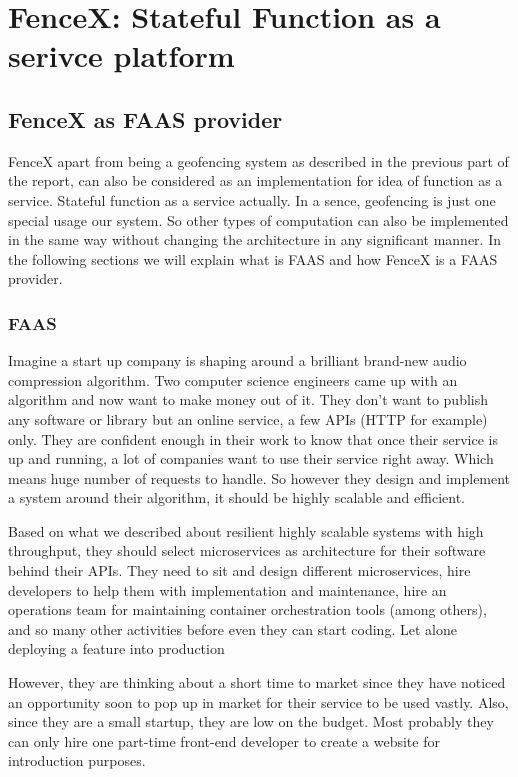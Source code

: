 \documentclass[a4]{report}
\begin{document}
        \part[Stateful FAAS]{FenceX: Stateful Function as a serivce platform}

        \chapter{FenceX as FAAS provider}
        FenceX apart from being a geofencing system as described in the previous part of the report, can also be
        considered as an implementation for idea of function as a service.
        Stateful function as a service actually.
        In a sence, geofencing is just one special usage our system.
        So other types of computation can also be implemented in the same way without changing the architecture in any
        significant manner.
        In the following sections we will explain what is FAAS and how FenceX is a FAAS provider.

        \section{FAAS}
        Imagine a start up company is shaping around a brilliant brand-new audio compression algorithm.
        Two computer science engineers came up with an algorithm and now want to make money out of it.
        They don't want to publish any software or library but an online service, a few APIs (HTTP for example) only.
        They are confident enough in their work to know that once their service is up and running, a lot of companies
        want to use their service right away.
        Which means huge number of requests to handle.
        So however they design and implement a system around their algorithm, it should be highly scalable and efficient.

        Based on what we described about resilient highly scalable systems with high throughput, they should select
        microservices as architecture for their software behind their APIs.
        They need to sit and design different microservices, hire developers to help them with implementation and
        maintenance, hire an operations team for maintaining container orchestration tools (among others), and so many
        other activities before even they can start coding.
        Let alone deploying a feature into production

        However, they are thinking about a short time to market since they have noticed an opportunity soon to pop up in
        market for their service to be used vastly.
        Also, since they are a small startup, they are low on the budget.
        Most probably they can only hire one part-time front-end developer to create a website for introduction
        purposes.
\end{document}
